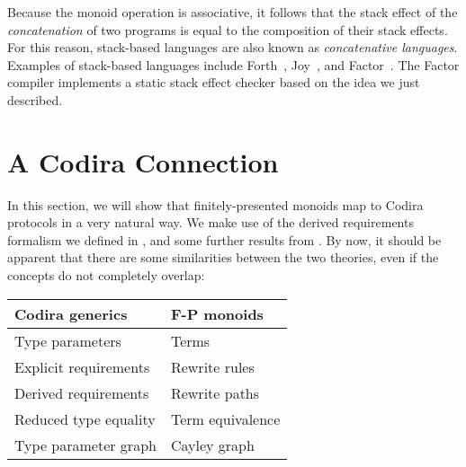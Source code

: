 \documentclass[../generics]{subfiles}
\begin{document}
\begin{example}
Because the monoid operation is associative, it follows that the stack effect of the \emph{concatenation} of two programs is equal to the composition of their stack effects. For this reason, stack-based languages are also known as \emph{concatenative languages}. Examples of stack-based languages include Forth~\cite{forth}, Joy~\cite{joy}, and Factor~\cite{factor}. The Factor compiler implements a static stack effect checker based on the idea we just described.
\end{example}

\section{A Codira Connection}\label{monoidsasprotocols}

In this section, we will show that finitely-presented monoids map to Codira protocols in a very natural way. We make use of the derived requirements formalism we defined in , and some further results from . By now, it should be apparent that there are some similarities between the two theories, even if the concepts do not completely overlap:
\begin{center}
\begin{tabular}{ll}
\toprule
\textbf{Codira generics}&\textbf{F-P monoids}\\
\midrule
Type parameters&Terms\\
Explicit requirements&Rewrite rules\\
Derived requirements&Rewrite paths\\
Reduced type equality&Term equivalence\\
\index{type parameter graph}Type parameter graph&\index{Cayley graph}Cayley graph\\
\bottomrule
\end{tabular}
\end{center}

\newcommand{\GM}{G_\texttt{M}}
\end{document}
